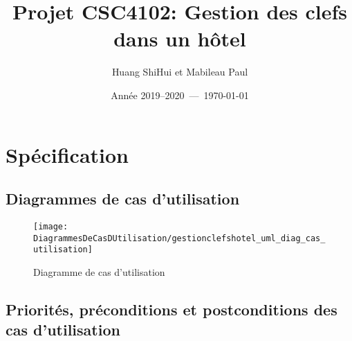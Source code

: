 \documentclass[11pt,article]{article}
\begin{document}
\title{Projet CSC4102: Gestion des clefs dans un hôtel}
\author{Huang ShiHui et Mabileau Paul}
\date{Année 2019--2020~---~\today}
\maketitle

\newpage

\tableofcontents

\newpage

\section{Spécification}

\subsection{Diagrammes de cas d'utilisation}

\begin{figure}[h!]
\begin{center}
\texttt{[image: DiagrammesDeCasDUtilisation/gestionclefshotel\_uml\_diag\_cas\_utilisation]}
\caption{Diagramme de cas d'utilisation}
\end{center}
\label{umlet_diag_cas_utilisation}
\end{figure}

\newpage

\subsection{Priorités, préconditions et postconditions des cas d'utilisation}
\end{document}
